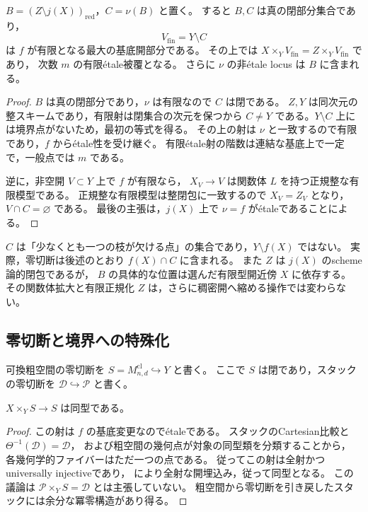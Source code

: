 \begin{proposition}[境界と有限となる最大の基底開]
\label{prop:normalization-boundary-locus}
$B=(Z\setminus j(X))_{\mathrm{red}}$，$C=\nu(B)$ と置く。
すると $B,C$ は真の閉部分集合であり，
\[
 V_{\mathrm{fin}}=Y\setminus C
\]
は $f$ が有限となる最大の基底開部分である。
その上では $X\times_YV_{\mathrm{fin}}=Z\times_YV_{\mathrm{fin}}$ であり，
次数 $m$ の有限\'{e}tale被覆となる。
さらに $\nu$ の非\'{e}tale locus は $B$ に含まれる。
\end{proposition}
\begin{proof}
$B$ は真の閉部分であり，$\nu$ は有限なので $C$ は閉である。
$Z,Y$ は同次元の整スキームであり，有限射は閉集合の次元を保つから
$C\ne Y$ である。$Y\setminus C$ 上には境界点がないため，最初の等式を得る。
その上の射は $\nu$ と一致するので有限であり，$f$ から\'{e}tale性を受け継ぐ。
有限\'{e}tale射の階数は連結な基底上で一定で，一般点では $m$ である。

逆に，非空開 $V\subset Y$ 上で $f$ が有限なら，
$X_V\to V$ は関数体 $L$ を持つ正規整な有限模型である。
正規整な有限模型は整閉包に一致するので $X_V=Z_V$ となり，
$V\cap C=\varnothing$ である。
最後の主張は，$j(X)$ 上で $\nu=f$ が\'{e}taleであることによる。
\end{proof}

\begin{remark}[開像との区別]
$C$ は「少なくとも一つの枝が欠ける点」の集合であり，$Y\setminus f(X)$ ではない。
実際，零切断は後述のとおり $f(X)\cap C$ に含まれる。
また $Z$ は $j(X)$ のscheme論的閉包であるが，
$B$ の具体的な位置は選んだ有限型開近傍 $X$ に依存する。
その関数体拡大と有限正規化 $Z$ は，さらに稠密開へ縮める操作では変わらない。
\end{remark}

\subsection{零切断と境界への特殊化}

可換粗空間の零切断を $S=M^{\mathrm{cl}}_{n,d}\hookrightarrow Y$ と書く。
ここで $S$ は閉であり，スタックの零切断を $\mathcal D\hookrightarrow\mathcal P$ と書く。

\begin{lemma}[粗零切断の逆像]
\label{lem:coarse-zero-preimage}
$X\times_Y S\to S$ は同型である。
\end{lemma}
\begin{proof}
この射は $f$ の基底変更なので\'{e}taleである。
スタックのCartesian比較と $\Theta^{-1}(\mathcal D)=\mathcal D$，
および粗空間の幾何点が対象の同型類を分類することから，
各幾何学的ファイバーはただ一つの点である。
従ってこの射は全射かつuniversally injectiveであり，
\cite[Tag 025G]{StacksProject}により全射な開埋込み，従って同型となる。
この議論は $\mathcal P\times_Y S=\mathcal D$ とは主張していない。
粗空間から零切断を引き戻したスタックには余分な冪零構造があり得る。
\end{proof}


